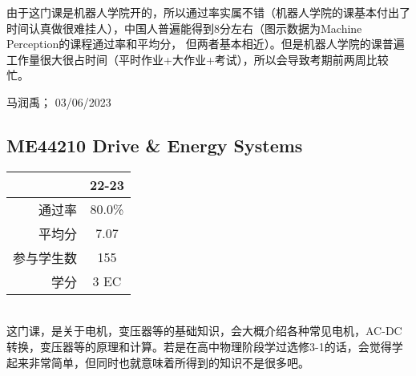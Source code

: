 由于这门课是机器人学院开的，所以通过率实属不错（机器人学院的课基本付出了时间认真做很难挂人），中国人普遍能得到8分左右（图示数据为Machine Perception的课程通过率和平均分， 但两者基本相近）。但是机器人学院的课普遍工作量很大很占时间（平时作业+大作业+考试），所以会导致考期前两周比较忙。

\begin{flushright}
马润禹； 03/06/2023
\end{flushright}

\subsection{ME44210 Drive \& Energy Systems}
\begin{minipage}{0.45\textwidth}
\centering
{}
\end{minipage}%
\begin{minipage}{0.45\textwidth}
\raggedleft
\begin{tabular}{r|c}
\textbf{ } & \textbf{22-23} \\ \hline
通过率 & 80.0\% \\ 
平均分 & 7.07 \\ 
参与学生数 & 155 \\ 
学分 & 3 EC\\
\end{tabular}
\end{minipage}\\

这门课，是关于电机，变压器等的基础知识，会大概介绍各种常见电机，AC-DC转换，变压器等的原理和计算。若是在高中物理阶段学过选修3-1的话，会觉得学起来非常简单，但同时也就意味着所得到的知识不是很多吧。

